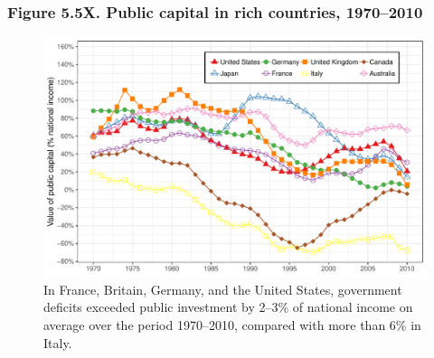 \documentclass[t]{beamer}\usepackage[]{graphicx}\usepackage[]{color}
\newenvironment{knitrout}{}{} %
\begin{document}
\begin{frame}[label=Figure_5_5X]
\frametitle{Figure 5.5X. Public capital in rich countries, 1970--2010}
\begin{figure}[t]
\begin{minipage}[b]{\textwidth}
\centering
\begin{knitrout}\footnotesize
{}\color{fgcolor}

{\centering \includegraphics[width=1\linewidth]{figures/color/Figure_5_5X} 

}



\end{knitrout}
\caption{In France, Britain, Germany, and the United States, government deficits exceeded public investment by 2--3\% of national income on average over the period 1970--2010, compared with more than 6\% in Italy.}
\end{minipage}
\end{figure}
\end{frame}
\end{document}
